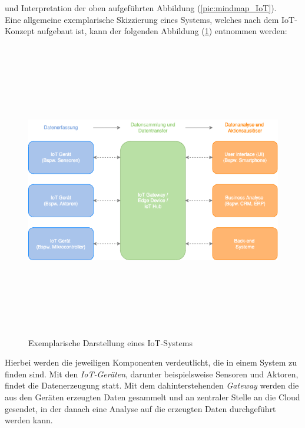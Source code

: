         und Interpretation der oben aufgeführten Abbildung (\ref{pic:mindmap_IoT}).
        \\
        \linebreak
        Eine allgemeine exemplarische Skizzierung eines Systems, welches nach dem \acs{IoT}-Konzept aufgebaut ist, kann der folgenden 
        Abbildung (\ref{pic:skizze_iot}) entnommen werden:
        \begin{figure}[hbt!]
            \centering
            \includegraphics[width=13cm,height=13cm,keepaspectratio]{images/IoT_Grundstruktur.png}
            \caption{Exemplarische Darstellung eines \acs{IoT}-Systems \cite{iotskizze2022}}
            \label{pic:skizze_iot}
        \end{figure}
        Hierbei werden die jeweiligen Komponenten verdeutlicht, die in einem System zu finden sind. Mit den \textit{IoT-Geräten}, darunter 
        beispielsweise Sensoren und Aktoren, findet die Datenerzeugung statt. Mit dem dahinterstehenden \textit{Gateway} werden die aus den Geräten 
        erzeugten Daten gesammelt und an zentraler Stelle an die Cloud gesendet, in der danach eine Analyse auf die erzeugten Daten 
        durchgeführt werden kann.

